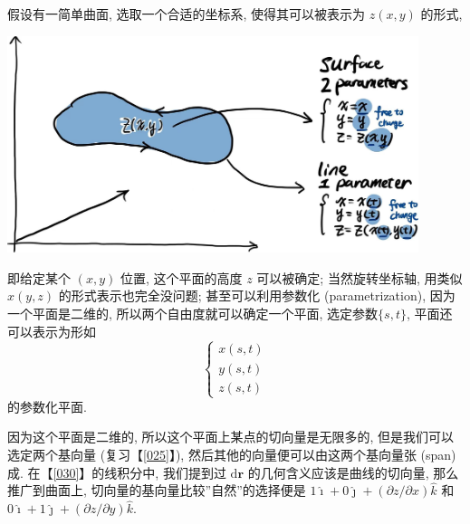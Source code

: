 假设有一简单曲面, 选取一个合适的坐标系, 使得其可以被表示为 $z(x,y)$
的形式,

\begin{tcolorbox}[size=fbox, breakable, enhanced jigsaw]
    \includegraphics[width=0.9\textwidth]{./img/image-20240621050652898.png}
\end{tcolorbox}

\begin{newquote}
即给定某个 $(x,y)$ 位置, 这个平面的高度 $z$ 可以被确定;
当然旋转坐标轴, 用类似 $x(y,z)$ 的形式表示也完全没问题;
甚至可以利用参数化 (parametrization), 因为一个平面是二维的,
所以两个自由度就可以确定一个平面, 选定参数$\{s,t\}$,
平面还可以表示为形如 \[
\begin{cases}
x(s,t)\\
y(s,t)\\
z(s,t)
\end{cases}
\] 的参数化平面.
\end{newquote}

因为这个平面是二维的, 所以这个平面上某点的切向量是无限多的,
但是我们可以选定两个基向量 (复习【\ref{025}】),
然后其他的向量便可以由这两个基向量张 (span) 成. 在【\ref{030}】的线积分中,
我们提到过 $\mathrm{d}\boldsymbol{r}$ 的几何含义应该是曲线的切向量,
那么推广到曲面上, 切向量的基向量比较''自然''的选择便是
$1\hat{\imath}+0\hat{\jmath}+(\partial z/\partial x)\hat{k}$ 和
$0\hat{\imath}+1\hat{\jmath}+(\partial z/\partial y)\hat{k}$.

